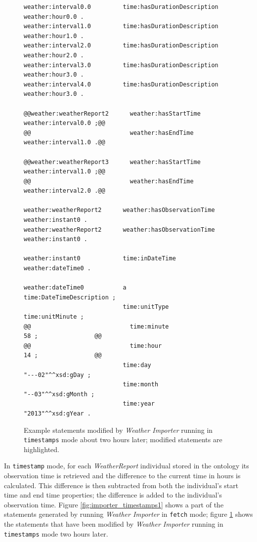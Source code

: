 \begin{figure}
\begin{lstlisting}[escapechar=!]
weather:interval0.0         time:hasDurationDescription           weather:hour0.0 .
weather:interval1.0         time:hasDurationDescription           weather:hour1.0 .
weather:interval2.0         time:hasDurationDescription           weather:hour2.0 .
weather:interval3.0         time:hasDurationDescription           weather:hour3.0 .
weather:interval4.0         time:hasDurationDescription           weather:hour3.0 .

@@weather:weatherReport2      weather:hasStartTime                  weather:interval0.0 ;@@
@@                            weather:hasEndTime                    weather:interval1.0 .@@

@@weather:weatherReport3      weather:hasStartTime                  weather:interval1.0 ;@@
@@                            weather:hasEndTime                    weather:interval2.0 .@@

weather:weatherReport2      weather:hasObservationTime            weather:instant0 .
weather:weatherReport2      weather:hasObservationTime            weather:instant0 .

weather:instant0            time:inDateTime                       weather:dateTime0 .

weather:dateTime0           a                                     time:DateTimeDescription ;
                            time:unitType                         time:unitMinute ;
@@                            time:minute                           58 ;                @@
@@                            time:hour                             14 ;                @@
                            time:day                              "---02"^^xsd:gDay ;
                            time:month                            "--03"^^xsd:gMonth ;
                            time:year                             "2013"^^xsd:gYear .
\end{lstlisting}
\caption{Example statements modified by \emph{Weather Importer} running in \texttt{timestamps} mode about two hours later; modified statements are highlighted.}
\label{fig:importer_timestamps2}
\end{figure}

In \texttt{timestamp} mode, for each \emph{WeatherReport} individual stored in the ontology its observation time is retrieved and the difference to the current time in hours is calculated. This difference is then subtracted from both the individual's start time and end time properties; the difference is added to the individual's observation time. Figure \ref{fig:importer_timestamps1} shows a part of the statements generated by running \emph{Weather Importer} in \texttt{fetch} mode; figure \ref{fig:importer_timestamps2} shows the statements that have been modified by \emph{Weather Importer} running in \texttt{timestamps} mode two hours later.

